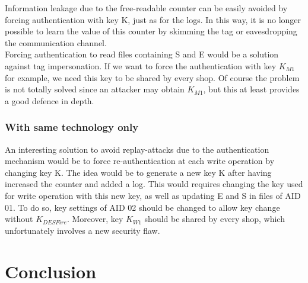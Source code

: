 \documentclass[a4paper,11pt,oneside]{article}
\begin{document}
Information leakage due to the free-readable counter can be easily avoided by forcing authentication with key K, just as for the logs. In this way, it is no longer possible to learn the value of this counter by skimming the tag or eavesdropping the communication channel. \\

Forcing authentication to read files containing S and E would be a solution against tag impersonation. If we want to force the authentication with key $K_{M1}$ for example, we need this key to be shared by every shop. Of course the problem is not totally solved since an attacker may obtain $K_{M1}$, but this at least provides a good defence in depth. \\


\subsubsection{With same technology only}

An interesting solution to avoid replay-attacks due to the authentication mechanism would be to force re-authentication at each write operation by changing key K. The idea would be to generate a new key K after having increased the counter and added a log. This would requires changing the key used for write operation with this new key, as well as updating E and S in files of AID 01. To do so, key settings of AID 02 should be changed to allow key change without $K_{DESFire}$. Moreover, key $K_{W1}$ should be shared by every shop, which unfortunately involves a new security flaw. \\

\section{Conclusion}
\end{document}
